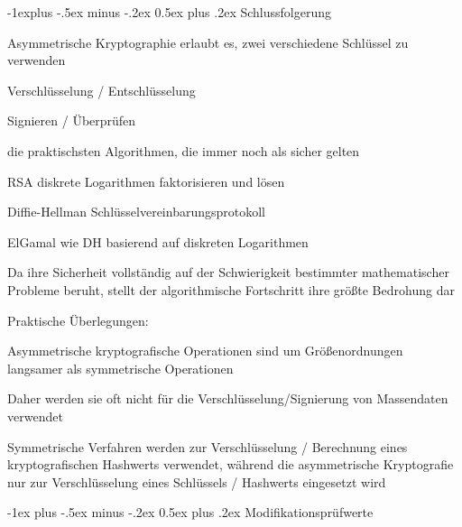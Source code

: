 \documentclass[a4paper]{article}
\makeatletter
\renewcommand{\section}{\@startsection{section}{1}{0mm}%
 {-1ex plus -.5ex minus -.2ex}%
 {0.5ex plus .2ex}%
 {\normalfont\large\bfseries}}
\renewcommand{\subsection}{\@startsection{subsection}{2}{0mm}%
 {-1explus -.5ex minus -.2ex}%
 {0.5ex plus .2ex}%
 {\normalfont\normalsize\bfseries}}
\makeatother
\begin{document}
\begin{multicols}{3}
      \subsection{Schlussfolgerung}
      \begin{itemize*}
            \item Asymmetrische Kryptographie erlaubt es, zwei verschiedene Schlüssel zu verwenden
            \begin{itemize*}
                  \item Verschlüsselung / Entschlüsselung
                  \item Signieren / Überprüfen
            \end{itemize*}
            \item die praktischsten Algorithmen, die immer noch als sicher gelten
            \begin{description*}
                  \item[RSA] diskrete Logarithmen faktorisieren und lösen
                  \item[Diffie-Hellman] Schlüsselvereinbarungsprotokoll
                  \item[ElGamal] wie DH basierend auf diskreten Logarithmen
            \end{description*}
            \item Da ihre Sicherheit vollständig auf der Schwierigkeit bestimmter mathematischer Probleme beruht, stellt der algorithmische Fortschritt ihre größte Bedrohung dar
            \item Praktische Überlegungen:
            \begin{itemize*}
                  \item Asymmetrische kryptografische Operationen sind um Größenordnungen langsamer als symmetrische Operationen
                  \item Daher werden sie oft nicht für die Verschlüsselung/Signierung von Massendaten verwendet
                  \item Symmetrische Verfahren werden zur Verschlüsselung / Berechnung eines kryptografischen Hashwerts verwendet, während die asymmetrische Kryptografie nur zur Verschlüsselung eines Schlüssels / Hashwerts eingesetzt wird
            \end{itemize*}
      \end{itemize*}

      \columnbreak

      \section{Modifikationsprüfwerte}

\end{multicols}
\end{document}
